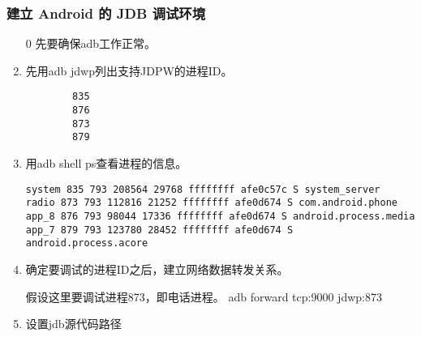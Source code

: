 \documentclass[a4paper,titlepage]{article}
\begin{document}
\subsubsection{建立 Android 的 JDB 调试环境}
\begin{enumerate}
\item [0]先要确保adb工作正常。
\item 先用adb jdwp列出支持JDPW的进程ID。
    \begin{lstlisting}
        835
        876
        873
        879
    \end{lstlisting}
\item  用adb shell ps查看进程的信息。
    \begin{lstlisting}
system 835 793 208564 29768 ffffffff afe0c57c S system_server
radio 873 793 112816 21252 ffffffff afe0d674 S com.android.phone
app_8 876 793 98044 17336 ffffffff afe0d674 S android.process.media
app_7 879 793 123780 28452 ffffffff afe0d674 S android.process.acore
\end{lstlisting}
\item  确定要调试的进程ID之后，建立网络数据转发关系。

假设这里要调试进程873，即电话进程。
{\center adb forward tcp:9000 jdwp:873}{\label{forward}}

\item 设置jdb源代码路径


\end{enumerate}
\end{document}

